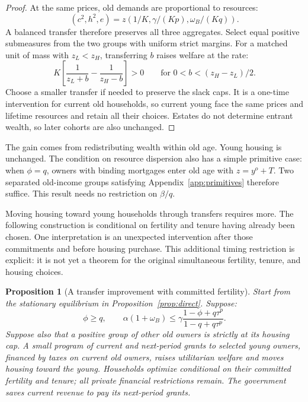 \documentclass[11pt]{article}
\newtheorem{proposition}{Proposition}
\begin{document}
\begin{proof}
At the same prices, old demands are proportional to resources:
\begin{equation}
(c^2,h^2,e)=z(1/K,\gamma/(Kp),\omega_B/(Kq)).
\end{equation}
A balanced transfer therefore preserves all three aggregates. Select equal
positive submeasures from the two groups with uniform strict margins. For a
matched unit of mass with $z_L<z_H$, transferring $b$ raises welfare at the rate:
\begin{equation}
K\left[\frac1{z_L+b}-\frac1{z_H-b}\right]>0
\qquad\text{for }0<b<(z_H-z_L)/2.
\end{equation}
Choose a smaller transfer if needed to preserve the slack caps. It is a
one-time intervention for current old households, so current young face the
same prices and lifetime resources and retain all their choices. Estates do
not determine entrant wealth, so later cohorts are also unchanged.
\end{proof}

The gain comes from redistributing wealth within old age. Young housing is
unchanged. The condition on resource dispersion also has a simple primitive
case: when $\phi=q$, owners with binding mortgages enter old age with
$z=y^o+T$. Two separated old-income groups satisfying
Appendix~\ref{app:primitives} therefore suffice. This result needs no
restriction on $\beta/q$.

Moving housing toward young households through transfers requires more.
The following construction is conditional on fertility and tenure having already
been chosen. One interpretation is an unexpected intervention after those
commitments and before housing purchase. This additional timing restriction
is explicit: it is not yet a theorem for the original simultaneous fertility,
tenure, and housing choices.

\begin{proposition}[A transfer improvement with committed fertility]
\label{prop:transfers}
Start from the stationary equilibrium in Proposition~\ref{prop:direct}.
Suppose:
\begin{equation}
\boxed{\quad
\phi\ge q,\qquad \alpha(1+\omega_B)\le
\gamma\frac{1-\phi+q\tau^p}{1-q+q\tau^p}.
\quad}
\label{eq:transfer_conditions}
\end{equation}
Suppose also that a positive group of other old owners is strictly at its
housing cap. A small program of current and next-period grants to selected young
owners, financed by taxes on current old owners, raises utilitarian welfare
and moves housing toward the young. Households optimize conditional on their
committed fertility and tenure; all private financial restrictions remain.
The government saves current revenue to pay its next-period grants.
\end{proposition}
\end{document}
